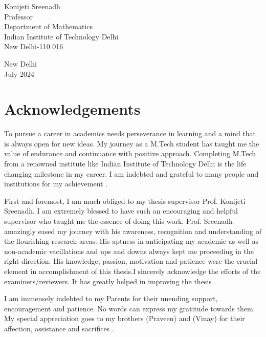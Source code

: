 \documentclass[12pt, a4paper]{report}
\begin{document}
\vspace{1in}
\begin{flushright}
    Konijeti Sreenadh\\
    Professor\\
    Department of Mathematics\\
    Indian Institute of Technology Delhi\\
    New Delhi-110 016
\end{flushright}
\begin{flushleft}
    New Delhi\\
    July 2024
\end{flushleft}

\chapter*{Acknowledgements}
To pursue a career in academics needs perseverance in learning and a mind that is always open for new ideas. My journey as a M.Tech student has taught me the value of endurance and continuance with positive approach. Completing M.Tech from a renowned institute like Indian Institute of Technology Delhi is the life changing milestone in my career. I am indebted and grateful to many people and institutions for my achievement \vspace{0.5cm}.

First and foremost, I am much obliged to my thesis supervisor Prof. Konijeti Sreenadh. I am extremely blessed to have such an encouraging and helpful supervisor who taught me the essence of doing this work. Prof. Sreenadh amazingly eased my journey with his awareness, recognition and understanding of the flourishing research areas. His aptness in anticipating my academic as well as non-academic vacillations and ups and downs always kept me proceeding in the right direction. His knowledge, passion, motivation and patience were the crucial element in accomplishment of this thesis.I sincerely acknowledge the efforts of the examiners/reviewers. It has greatly helped in improving the thesis \vspace{0.5cm}.

I am immensely indebted to my Parents for their unending support, encouragement and patience. No words can express my gratitude towards them. My special appreciation goes to my brothers (Praveen) and (Vinay) for their affection, assistance and sacrifices \vspace{0.5cm}.
\end{document}
